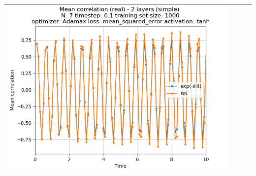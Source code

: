 \documentclass{article}
\begin{document}
\begin{tabular}{|c|c|c|c|}
     \includegraphics[scale=0.37]{./Searching_for_good_train_set_size/2_layers_simple_train_samples=1000_timestep=0.1_t_total=10.0_optimizer=Adamax_loss=mean_squared_error_activation=tanh/Corr_N=7_(real).png} \\ \hline

\end{tabular}
\end{document}
